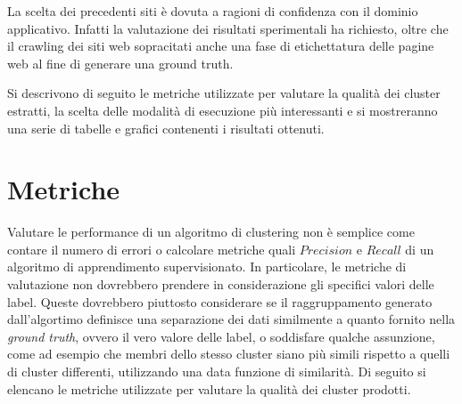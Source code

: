 La scelta dei precedenti siti è dovuta a ragioni di confidenza con il dominio applicativo. Infatti la valutazione dei risultati sperimentali ha richiesto, oltre che il crawling dei siti web sopracitati anche una fase di etichettatura delle pagine web al fine di generare una ground truth.

Si descrivono di seguito le metriche utilizzate per valutare la qualità dei cluster estratti, la scelta delle modalità di esecuzione più interessanti e si mostreranno una serie di tabelle e grafici contenenti i risultati ottenuti. 


\section{Metriche}
Valutare le performance di un algoritmo di clustering non è semplice come contare il numero di errori o calcolare metriche quali $Precision$ e $Recall$ di un algoritmo di apprendimento supervisionato. In particolare, le metriche di valutazione non dovrebbero prendere in considerazione gli specifici valori delle label. Queste dovrebbero piuttosto considerare se il raggruppamento generato dall'algortimo definisce una separazione dei dati similmente a quanto fornito nella \textit{ground truth}, ovvero il vero valore delle label, o soddisfare qualche assunzione, come ad esempio che membri dello stesso cluster siano più simili rispetto a quelli di cluster differenti, utilizzando una data funzione di similarità. Di seguito si elencano le metriche utilizzate per valutare la qualità dei cluster prodotti.


